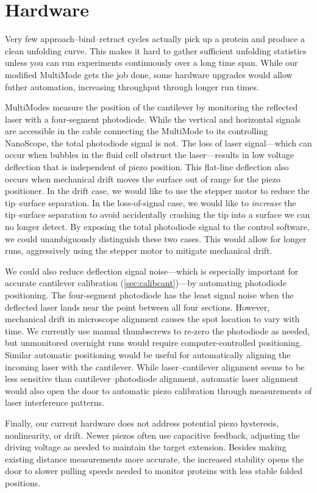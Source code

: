 \section{Hardware}
\label{sec:future:hardware}

Very few approach--bind--retract cycles actually pick up a protein and
produce a clean unfolding curve.  This makes it hard to gather
sufficient unfolding statistics unless you can run experiments
continuously over a long time span.  While our modified
MultiMode\citep{multimode} gets the job done, some hardware upgrades
would allow futher automation, increasing throughput through longer
run times.

MultiModes measure the position of the cantilever by monitoring the
reflected laser with a four-segment photodiode.  While the vertical
and horizontal signals are accessible in the cable connecting the
MultiMode to its controlling NanoScope, the total photodiode signal is
not.  The loss of laser signal---which can occur when bubbles in the
fluid cell obstruct the laser---results in low voltage deflection that
is independent of piezo position.  This flat-line deflection also
occurs when mechanical drift moves the surface out of range for the
piezo positioner.  In the drift case, we would like to use the stepper
motor to reduce the tip--surface separation.  In the loss-of-signal
case, we would like to \emph{increase} the tip--surface separation to
avoid accidentally crashing the tip into a surface we can no longer
detect.  By exposing the total photodiode signal to the control
software, we could unambiguously distinguish these two cases.  This
would allow for longer runs, aggressively using the stepper motor to
mitigate mechanical drift.

We could also reduce deflection signal noise---which is especially
important for accurate cantilever calibration
(\cref{sec:calibcant})---by automating photodiode positioning.  The
four-segment photodiode has the least signal noise when the deflected
laser lands near the point between all four sections.  However,
mechanical drift in microscope alignment causes the spot location to
vary with time.  We currently use manual thumbscrews to re-zero the
photodiode as needed, but unmonitored overnight runs would require
computer-controlled positioning.  Similar automatic positioning would
be useful for automatically aligning the incoming laser with the
cantilever.  While laser--cantilever alignment seems to be less
sensitive than cantilever--photodiode alignment, automatic laser
alignment would also open the door to automatic piezo calibration
through measurements of laser interference patterns\citep{jaschke95}.

Finally, our current hardware does not address potential piezo
hysteresis, nonlinearity, or drift.  Newer piezos often use capacitive
feedback, adjusting the driving voltage as needed to maintain the
target extension.  Besides making existing distance measurements more
accurate, the increased stability opens the door to slower pulling
speeds needed to monitor proteins with less stable folded positions.
